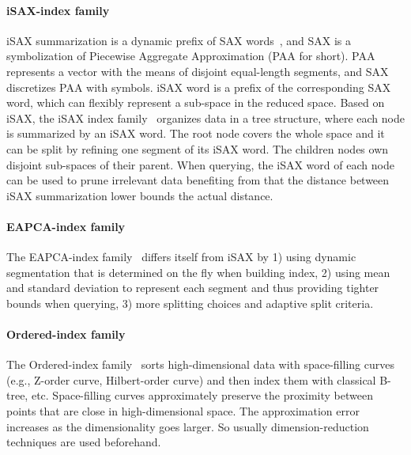 \documentclass[11pt]{article}
\begin{document}
\paragraph{iSAX-index family}
iSAX summarization is a dynamic prefix of SAX words~\cite{sax}, and SAX is a symbolization of Piecewise Aggregate Approximation (PAA for short).
PAA represents a vector with the means of disjoint equal-length segments, and SAX discretizes PAA with symbols.
iSAX word is a prefix of the corresponding SAX word, which can flexibly represent a sub-space in the reduced space.
Based on iSAX, the iSAX index family~\cite{evolution} organizes data in a tree structure, where each node is summarized by an iSAX word.
The root node covers the whole space and it can be split by refining one segment of its iSAX word.
The children nodes own disjoint sub-spaces of their parent.
When querying, the iSAX word of each node can be used to prune irrelevant data benefiting from that the distance between iSAX summarization lower bounds the actual distance.

\paragraph{EAPCA-index family}
The EAPCA-index family~\cite{dstree} differs itself from iSAX by 1) using dynamic segmentation that is determined on the fly when building index, 2) using mean and standard deviation to represent each segment and thus providing tighter bounds when querying, 3) more splitting choices and adaptive split criteria.

\paragraph{Ordered-index family}
The Ordered-index family~\cite{coconut} sorts high-dimensional data with space-filling curves (e.g., Z-order curve, Hilbert-order curve) and then index them with classical B-tree, etc.
Space-filling curves approximately preserve the proximity between points that are close in high-dimensional space.
The approximation error increases as the dimensionality goes larger.
So usually dimension-reduction techniques are used beforehand.
\end{document}
